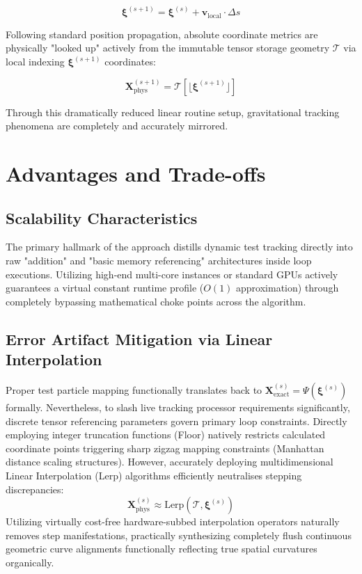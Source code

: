 \documentclass[11pt]{article}
\begin{document}
\[
\boldsymbol{\xi}^{(s+1)} = \boldsymbol{\xi}^{(s)} + \mathbf{v}_{\text{local}} \cdot \Delta s
\]

Following standard position propagation, absolute coordinate metrics are physically "looked up" actively from the immutable tensor storage geometry $\mathcal{T}$ via local indexing $\boldsymbol{\xi}^{(s+1)}$ coordinates:

\[
\mathbf{X}_{\text{phys}}^{(s+1)} = \mathcal{T} [\lfloor \boldsymbol{\xi}^{(s+1)} \rfloor ]
\]

Through this dramatically reduced linear routine setup, gravitational tracking phenomena are completely and accurately mirrored.

\section{Advantages and Trade-offs}

\subsection{Scalability Characteristics}
The primary hallmark of the approach distills dynamic test tracking directly into raw "addition" and "basic memory referencing" architectures inside loop executions. Utilizing high-end multi-core instances or standard GPUs actively guarantees a virtual constant runtime profile ($O(1)$ approximation) through completely bypassing mathematical choke points across the algorithm.

\subsection{Error Artifact Mitigation via Linear Interpolation}
Proper test particle mapping functionally translates back to $\mathbf{X}_{\text{exact}}^{(s)} = \Psi(\boldsymbol{\xi}^{(s)})$ formally. Nevertheless, to slash live tracking processor requirements significantly, discrete tensor referencing parameters govern primary loop constraints. Directly employing integer truncation functions (Floor) natively restricts calculated coordinate points triggering sharp zigzag mapping constraints (Manhattan distance scaling structures).
However, accurately deploying multidimensional Linear Interpolation (Lerp) algorithms efficiently neutralises stepping discrepancies:
\[
\mathbf{X}_{\text{phys}}^{(s)} \approx \mathrm{Lerp}(\mathcal{T}, \boldsymbol{\xi}^{(s)})
\]
Utilizing virtually cost-free hardware-subbed interpolation operators naturally removes step manifestations, practically synthesizing completely flush continuous geometric curve alignments functionally reflecting true spatial curvatures organically.
\end{document}
